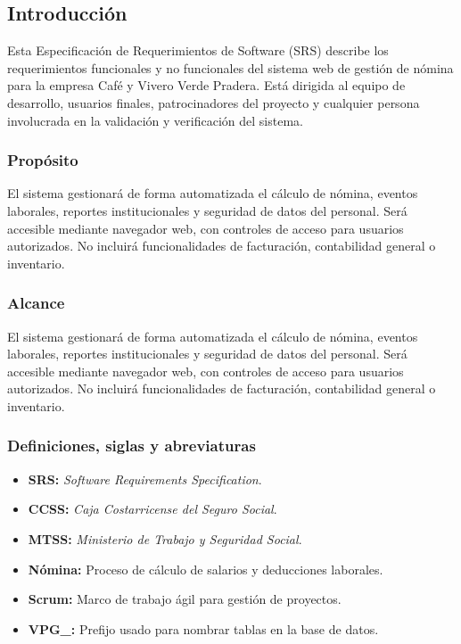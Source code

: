 \subsection*{Introducción}
Esta Especificación de Requerimientos de Software (SRS) describe los
requerimientos funcionales y no funcionales del sistema web de gestión de nómina
para la empresa Café y Vivero Verde Pradera. Está dirigida al equipo de desarrollo,
usuarios finales, patrocinadores del proyecto y cualquier persona involucrada en la
validación y verificación del sistema.

\subsubsection*{Propósito}
El sistema gestionará de forma automatizada el cálculo de nómina, eventos laborales,
reportes institucionales y seguridad de datos del personal. Será accesible mediante
navegador web, con controles de acceso para usuarios autorizados. No incluirá
funcionalidades de facturación, contabilidad general o inventario.

\subsubsection*{Alcance}

El sistema gestionará de forma automatizada el cálculo de nómina,
eventos laborales, reportes institucionales y seguridad de datos del
personal. Será accesible mediante navegador web, con controles de acceso
para usuarios autorizados. No incluirá funcionalidades de facturación,
contabilidad general o inventario.

\subsubsection*{Definiciones, siglas y abreviaturas}

\begin{itemize}
	\item \textbf{SRS:} \textit{Software Requirements Specification}.
	\item \textbf{CCSS:} \textit{Caja Costarricense del Seguro Social}.
	\item \textbf{MTSS:} \textit{Ministerio de Trabajo y Seguridad Social}.
	\item \textbf{Nómina:} Proceso de cálculo de salarios y deducciones laborales.
	\item \textbf{Scrum:} Marco de trabajo ágil para gestión de proyectos.
	\item \textbf{VPG\_:} Prefijo usado para nombrar tablas en la base de datos.
\end{itemize}

